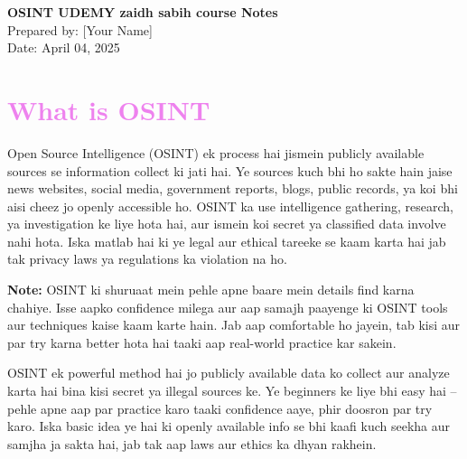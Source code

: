 \documentclass[a4paper,12pt]{article}
\begin{document}
\begin{titlepage}
    \centering
    \vspace*{5cm}
    {\Huge\bfseries\textcolor{warningred}{OSINT UDEMY zaidh sabih course Notes}} \\[1cm]
    {\Large Prepared by: [Your Name]} \\[0.5cm]
    {\large Date: April 04, 2025}
    \vfill
\end{titlepage}

\section*{\textbf{\LARGE \textcolor{violet}{What is OSINT}}}
Open Source Intelligence (OSINT) ek process hai jismein publicly available sources se information collect ki jati hai. Ye sources kuch bhi ho sakte hain jaise news websites, social media, government reports, blogs, public records, ya koi bhi aisi cheez jo openly accessible ho. \textcolor{warningred}{OSINT ka use intelligence gathering, research, ya investigation ke liye hota hai, aur ismein koi secret ya classified data involve nahi hota.} Iska matlab hai ki ye legal aur ethical tareeke se kaam karta hai jab tak privacy laws ya regulations ka violation na ho.

\textbf{Note:} \textcolor{warningred}{OSINT ki shuruaat mein pehle apne baare mein details find karna chahiye.} Isse aapko confidence milega aur aap samajh paayenge ki OSINT tools aur techniques kaise kaam karte hain. Jab aap comfortable ho jayein, tab kisi aur par try karna better hota hai taaki aap real-world practice kar sakein.

\begin{notebox}
    OSINT ek powerful method hai jo publicly available data ko collect aur analyze karta hai bina kisi secret ya illegal sources ke. Ye beginners ke liye bhi easy hai – pehle apne aap par practice karo taaki confidence aaye, phir doosron par try karo. \textcolor{warningred}{Iska basic idea ye hai ki openly available info se bhi kaafi kuch seekha aur samjha ja sakta hai, jab tak aap laws aur ethics ka dhyan rakhein.}
\end{notebox}

\end{document}
